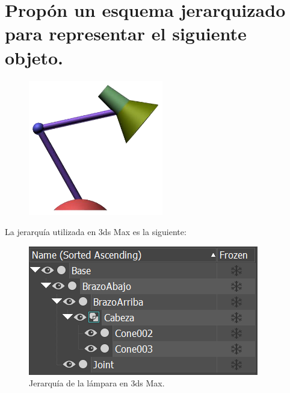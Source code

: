 \documentclass{article}
\begin{document}
\section{Propón un esquema jerarquizado para representar el siguiente objeto.}

\begin{figure}[H]
    \centering
    \includegraphics[width=\textwidth]{imagenes/lamp.png}
 \end{figure}    


La jerarquía utilizada en 3ds Max es la siguiente:

\begin{figure}[H]
    \centering
    \includegraphics[width=\textwidth]{imagenes/lampjerar.png}
    \caption{Jerarquía de la lámpara en 3ds Max.}
 \end{figure}    
\end{document}
